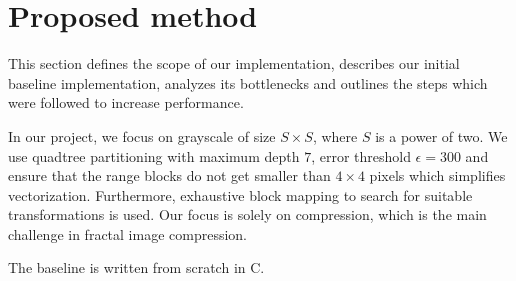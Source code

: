 \section{Proposed method}\label{sec:yourmethod}

This section defines the scope of our implementation, describes our initial baseline
implementation, analyzes its bottlenecks and outlines the steps which were followed to
increase performance.

In our project, we focus on grayscale of size $S \times S$, where $S$ is a power of two.
We use quadtree partitioning with maximum depth $7$, error threshold $\epsilon = 300$ and ensure
that the range blocks do not get smaller than $4 \times 4$ pixels which simplifies vectorization.
Furthermore, exhaustive block mapping to search for suitable transformations is used.
Our focus is solely on compression, which is the main challenge in fractal image compression.


The baseline is written from scratch in C.

